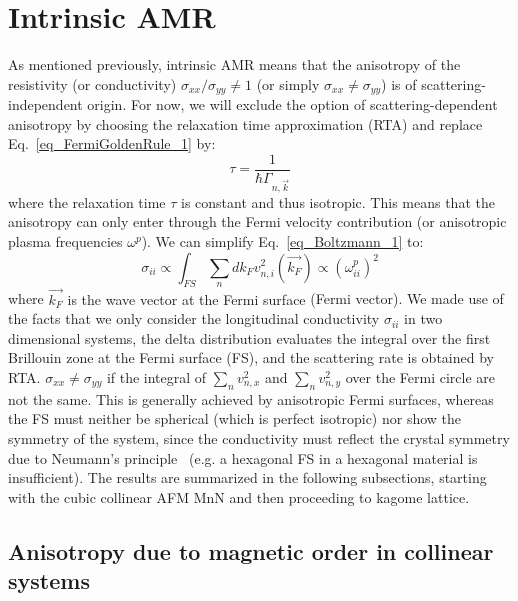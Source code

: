 \documentclass[prb,showpacs,amsmath,amssymb,superscriptaddress,twocolumn,floatfix]{revtex4-1}
\begin{document}
\section{Intrinsic AMR}
\label{sec_intrinsic}

As mentioned previously, intrinsic AMR means that the anisotropy of
the resistivity (or conductivity) $\sigma_{xx} / \sigma_{yy} \neq 1$
(or simply $\sigma_{xx} \neq \sigma_{yy}$) is of
scattering-independent origin. For now, we will exclude the option of scattering-dependent anisotropy by choosing the relaxation time approximation (RTA)\cite{Vyborny:2009_a} and replace Eq.~\ref{eq_FermiGoldenRule_1} by:
\begin{equation}
	\tau = \frac{1}{\hbar \Gamma_{n, \vec{k}}}
\end{equation}
where the relaxation time $\tau$ is constant and thus isotropic. This
means that the anisotropy can only enter through the Fermi velocity
contribution (or anisotropic plasma frequencies $\omega^p$). We can simplify Eq.~\ref{eq_Boltzmann_1} to:
%
\begin{equation}
	\sigma_{ii} \propto \int_ {FS} \sum_n   dk_F  v^2_{n,i}(\vec{k_F})
        \propto (\omega_{ii}^p)^2
	\label{eq_Boltzmann_2}
\end{equation}
%
where {\color{red}$\vec{k_F}$ is the wave vector at the Fermi surface} (Fermi
vector).
We made use of the facts that we only consider the
longitudinal conductivity $\sigma_{ii}$ in two dimensional systems,
the delta distribution evaluates the integral over the first Brillouin
zone at the Fermi surface (FS), and the scattering rate is obtained by
RTA. $\sigma_{xx} \neq \sigma_{yy}$ if the integral of $\sum_n
v^2_{n,x}$ and $\sum_n v^2_{n,y}$ over the Fermi circle are not the
same. This is generally achieved by anisotropic Fermi surfaces,
whereas the FS must neither be spherical (which is perfect isotropic)
nor show the symmetry of the system, since the conductivity must
reflect the crystal symmetry due to Neumann's
principle~\cite{Ritzinger:2021} (e.g. a hexagonal FS in a hexagonal
material is insufficient). The results are summarized in the following
subsections, starting with the cubic collinear AFM MnN and
then proceeding to kagome lattice.

\subsection{Anisotropy due to magnetic order in collinear systems}
\end{document}
